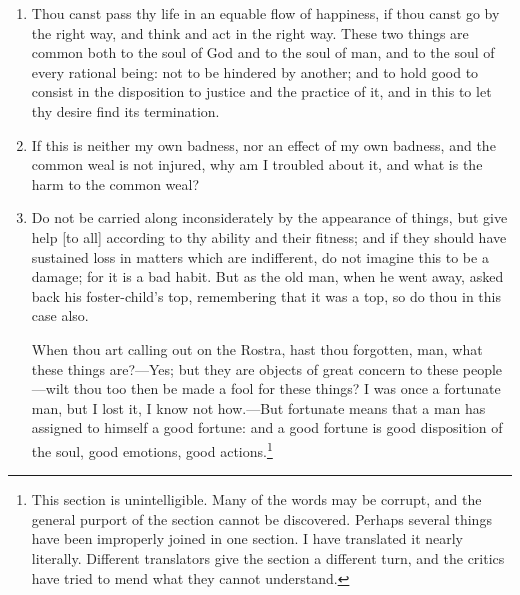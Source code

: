 \begin{enumerate}
\item Thou canst pass thy life in an equable flow of happiness, if thou canst go by the right way, and think and act in the right way. These two things are common both to the soul of God and to the soul of man, and to the soul of every rational being: not to be hindered by another; and to hold good to consist in the disposition to justice and the practice of it, and in this to let thy desire find its termination.

\item If this is neither my own badness, nor an effect of my own badness, and the common weal is not injured, why am I troubled about it, and what is the harm to the common weal?

\item Do not be carried along inconsiderately by the appearance of things, but give help [{\clarify to all}] according to thy ability and their fitness; and if they should have sustained loss in matters which are indifferent, do not imagine this to be a damage; for it is a bad habit. But as the old man, when he went away, asked back his foster-child's top, remembering that it was a top, so do thou in this case also.

When thou art calling out on the Rostra, hast thou forgotten, man, what these things are?—Yes; but they are objects of great concern to these people—wilt thou too then be made a fool for these things? I was once a fortunate man, but I lost it, I know not how.—But fortunate means that a man has assigned to himself a good fortune: and a good fortune is good disposition of the soul, good emotions, good actions.\footnote{This section is unintelligible. Many of the words may be corrupt, and the general purport of the section cannot be discovered. Perhaps several things have been improperly joined in one section. I have translated it nearly literally. Different translators give the section a different turn, and the critics have tried to mend what they cannot understand.}
\end{enumerate}